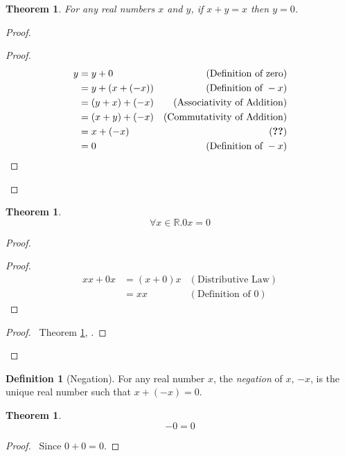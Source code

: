 \documentclass{report}
\let\qed\relax
\newtheorem{thm}[ax]{Theorem}
\theoremstyle{definition}
\newtheorem{df}[ax]{Definition}
\begin{document}
\begin{thm}
\label{thm:y_equals_zero}
For any real numbers $x$ and $y$, if $x + y = x$ then $y = 0$.
\end{thm}

\begin{proof}
\pf
{}
\begin{proof}
	\pf
	\begin{align*}
		y & = y + 0 & (\text{Definition of zero}) \\
		& = y + (x + (-x)) & (\text{Definition of } -x) \\
		& = (y + x) + (-x) & (\text{Associativity of Addition}) \\
		& = (x + y) + (-x) & (\text{Commutativity of Addition}) \\
		& = x + (-x) & (\text{\stepref{2}}) \\
		& = 0 & (\text{Definition of } -x)
	\end{align*}
\end{proof}
\qed
\end{proof}

\begin{thm}
\label{thm:multiply_by_zero}
\[ \forall x \in \mathbb{R}. 0x = 0 \]
\end{thm}

\begin{proof}
\pf
{}
\begin{proof}
	\pf
	\begin{align*}
		xx + 0x & = (x + 0) x & (\text{Distributive Law}) \\
		& = xx & (\text{Definition of } 0)
	\end{align*}
\end{proof}
\begin{proof}
	\pf\ Theorem \ref{thm:y_equals_zero}, .
\end{proof}
\qed
\end{proof}

\begin{df}[Negation]
For any real number $x$, the \emph{negation} of $x$, $-x$, is the unique real number such that $x + (-x) = 0$.
\end{df}

\begin{thm}
\[ -0 = 0 \]
\end{thm}

\begin{proof}
\pf\ Since $0 + 0 = 0$. \qed
\end{proof}
\end{document}
